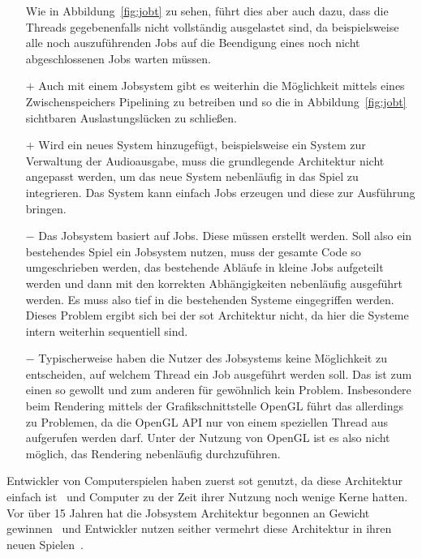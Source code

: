 \begin{itemize}
	Wie in Abbildung~\vref{fig:jobt} zu sehen, führt dies aber auch dazu, dass die Threads gegebenenfalls nicht vollständig ausgelastet sind, da beispielsweise alle noch auszuführenden Jobs auf die Beendigung eines noch nicht abgeschlossenen Jobs warten müssen.
	\item[$+$] Auch mit einem Jobsystem gibt es weiterhin die Möglichkeit mittels eines Zwischenspeichers Pipelining zu betreiben und so die in Abbildung~\vref{fig:jobt} sichtbaren Auslastungslücken zu schließen.
	\item[$+$] Wird ein neues System hinzugefügt, beispielsweise ein System zur Verwaltung der Audioausgabe, muss die grundlegende Architektur nicht angepasst werden, um das neue System nebenläufig in das Spiel zu integrieren. Das System kann einfach Jobs erzeugen und diese zur Ausführung bringen.
	\item[$-$] Das Jobsystem basiert auf Jobs. Diese müssen erstellt werden. Soll also ein bestehendes Spiel ein Jobsystem nutzen, muss der gesamte Code so umgeschrieben werden, das bestehende Abläufe in kleine Jobs aufgeteilt werden und dann mit den korrekten Abhängigkeiten nebenläufig ausgeführt werden. Es muss also tief in die bestehenden Systeme eingegriffen werden. Dieses Problem ergibt sich bei der \ac{sot} Architektur nicht, da hier die Systeme intern weiterhin sequentiell sind.
	\item[$-$] Typischerweise haben die Nutzer des Jobsystems keine Möglichkeit zu entscheiden, auf welchem Thread ein Job ausgeführt werden soll. Das ist zum einen so gewollt und zum anderen für gewöhnlich kein Problem. Insbesondere beim Rendering mittels der Grafikschnittstelle OpenGL führt das allerdings zu Problemen, da die OpenGL API nur von einem speziellen Thread aus aufgerufen werden darf. Unter der Nutzung von OpenGL ist es also nicht möglich, das Rendering nebenläufig durchzuführen.
\end{itemize}

Entwickler von Computerspielen haben zuerst \ac{sot} genutzt, da diese Architektur einfach ist~\cite{Genova2015,Tatarchuk2014} und Computer zu der Zeit ihrer Nutzung noch wenige Kerne hatten. Vor über 15 Jahren hat die Jobsystem Architektur begonnen an Gewicht gewinnen~\cite{Davies2006} und Entwickler nutzen seither vermehrt diese Architektur in ihren neuen Spielen~\cite{Tatarchuk2014,Genova2015,Gyrling2015,Hodgman2016}.

